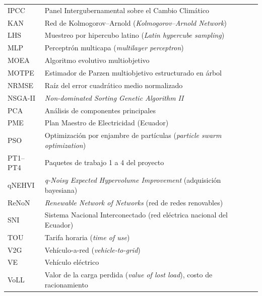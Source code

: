 \documentclass[11pt,a4paper]{article}
\begin{document}
\begin{longtable}{L{2.6cm}L{11.6cm}}
IPCC & Panel Intergubernamental sobre el Cambio Clim\'atico \\
KAN & Red de Kolmogorov--Arnold (\emph{Kolmogorov--Arnold Network}) \\
LHS & Muestreo por hipercubo latino (\emph{Latin hypercube sampling}) \\
MLP & Perceptr\'on multicapa (\emph{multilayer perceptron}) \\
MOEA & Algoritmo evolutivo multiobjetivo \\
MOTPE & Estimador de Parzen multiobjetivo estructurado en \'arbol \\
NRMSE & Ra\'iz del error cuadr\'atico medio normalizado \\
NSGA-II & \emph{Non-dominated Sorting Genetic Algorithm II} \\
PCA & An\'alisis de componentes principales \\
PME & Plan Maestro de Electricidad (Ecuador) \\
PSO & Optimizaci\'on por enjambre de part\'iculas (\emph{particle swarm optimization}) \\
PT1--PT4 & Paquetes de trabajo 1 a 4 del proyecto \\
qNEHVI & \emph{q-Noisy Expected Hypervolume Improvement} (adquisici\'on bayesiana) \\
ReNoN & \emph{Renewable Network of Networks} (red de redes renovables) \\
SNI & Sistema Nacional Interconectado (red el\'ectrica nacional del Ecuador) \\
TOU & Tarifa horaria (\emph{time of use}) \\
V2G & Veh\'iculo-a-red (\emph{vehicle-to-grid}) \\
VE & Veh\'iculo el\'ectrico \\
VoLL & Valor de la carga perdida (\emph{value of lost load}), costo de racionamiento \\
\end{longtable}
\end{document}
